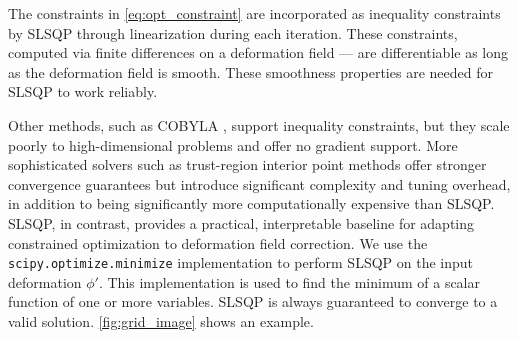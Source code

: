 \documentclass[lettersize,journal]{IEEEtran}
\begin{document}
The constraints in \autoref{eq:opt_constraint} are incorporated as inequality constraints by SLSQP through linearization during each iteration. These constraints, computed via finite differences on a deformation field — are differentiable as long as the deformation field is smooth. These smoothness properties are needed for SLSQP to work reliably. 


Other methods, such as COBYLA \cite{Powell1994}, support inequality constraints, but they scale poorly to high-dimensional problems and offer no gradient support. More sophisticated solvers such as trust-region interior point methods \cite{Byrd2000} offer stronger convergence guarantees but introduce significant complexity and tuning overhead, in addition to being significantly more computationally expensive than SLSQP. SLSQP, in contrast, provides a practical, interpretable baseline for adapting constrained optimization to deformation field correction. We use the \texttt{scipy.optimize.minimize} implementation \cite{SciPySLSQPDoc} to perform SLSQP on the input deformation $\phi'$. This implementation is used to find the minimum of a scalar function of one or more variables. SLSQP is always guaranteed to converge to a valid solution. \autoref{fig:grid_image} shows an example.

\end{document}
